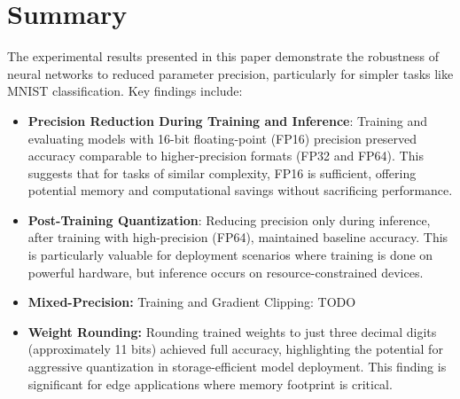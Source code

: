\documentclass[11pt]{article}
\begin{document}
\section{Summary}


The experimental results presented in this paper demonstrate the robustness of neural
networks to reduced parameter precision, particularly for simpler tasks like MNIST
classification. Key findings include:

\begin{itemize}
	\item \textbf{Precision Reduction During Training and Inference}: Training and evaluating
	models with 16-bit floating-point (FP16) precision preserved accuracy comparable to
	higher-precision formats (FP32 and FP64). This suggests that for tasks of similar
	complexity, FP16 is sufficient, offering potential memory and computational savings
	without sacrificing performance.

	\item \textbf{Post-Training Quantization}: Reducing precision only during inference, after
	training with high-precision (FP64), maintained baseline accuracy. This is
	particularly valuable for deployment scenarios where training is done on powerful
	hardware, but inference occurs on resource-constrained devices.

	\item \textbf{Mixed-Precision:} Training and Gradient Clipping: TODO

	\item \textbf{Weight Rounding:} Rounding trained weights to just three decimal digits
	(approximately 11 bits) achieved full accuracy, highlighting the potential for
	aggressive quantization in storage-efficient model deployment. This finding is
	significant for edge applications where memory footprint is critical.
\end{itemize}
\end{document}
